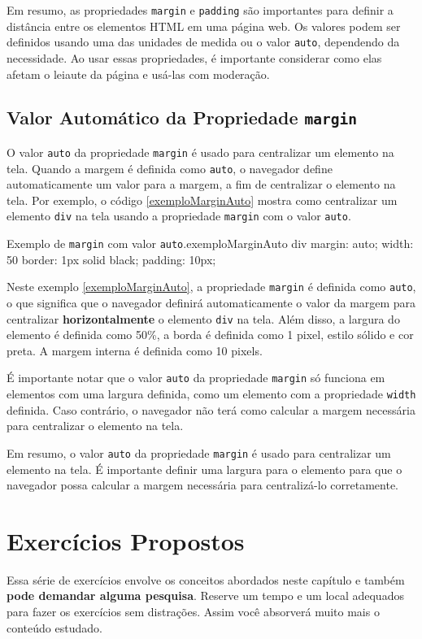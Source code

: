 Em resumo, as propriedades \texttt{margin} e \texttt{padding} são importantes para definir a distância entre os elementos HTML em uma página web. Os valores podem ser definidos usando uma das unidades de medida ou o valor \texttt{auto}, dependendo da necessidade. Ao usar essas propriedades, é importante considerar como elas afetam o leiaute da página e usá-las com moderação.

\subsection{Valor Automático da Propriedade \texttt{margin}}

O valor \texttt{auto} da propriedade \texttt{margin} é usado para centralizar um elemento na tela. Quando a margem é definida como \texttt{auto}, o navegador define automaticamente um valor para a margem, a fim de centralizar o elemento na tela. Por exemplo, o código \ref{exemploMarginAuto} mostra como centralizar um elemento \texttt{div} na tela usando a propriedade \texttt{margin} com o valor \texttt{auto}.

\begin{csscode}{Exemplo de \texttt{margin} com valor \texttt{auto}.}{exemploMarginAuto}
div {
    margin: auto;
    width: 50%
    border: 1px solid black;
    padding: 10px;
}
\end{csscode}

Neste exemplo \ref{exemploMarginAuto}, a propriedade \texttt{margin} é definida como \texttt{auto}, o que significa que o navegador definirá automaticamente o valor da margem para centralizar \textbf{horizontalmente} o elemento \texttt{div} na tela. Além disso, a largura do elemento é definida como 50\%, a borda é definida como 1 pixel, estilo sólido e cor preta. A margem interna é definida como 10 pixels.

É importante notar que o valor \texttt{auto} da propriedade \texttt{margin} só funciona em elementos com uma largura definida, como um elemento com a propriedade \texttt{width} definida. Caso contrário, o navegador não terá como calcular a margem necessária para centralizar o elemento na tela.

Em resumo, o valor \texttt{auto} da propriedade \texttt{margin} é usado para centralizar um elemento na tela. É importante definir uma largura para o elemento para que o navegador possa calcular a margem necessária para centralizá-lo corretamente.

\section{Exercícios Propostos}

Essa série de exercícios envolve os conceitos abordados neste capítulo e também \textbf{pode demandar alguma pesquisa}. Reserve um tempo e um local adequados para fazer os exercícios sem distrações. Assim você absorverá muito mais o conteúdo estudado.